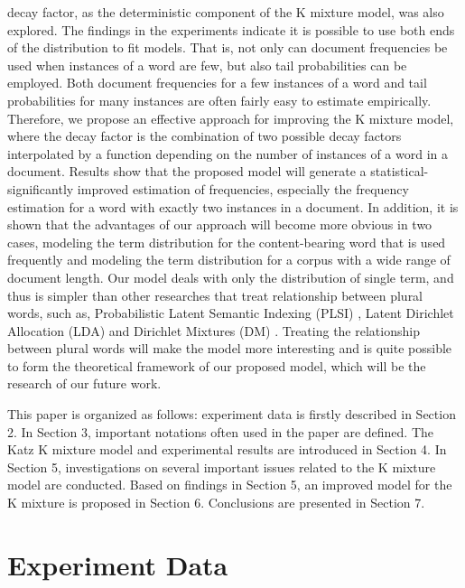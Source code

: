 \documentclass[english]{jnlp_1.4_rep}
\begin{document}
decay factor, as the deterministic component of the K mixture model, was also explored. The findings in the experiments indicate it is possible to
use both ends of the distribution to fit models. That is, not only can document frequencies be used when instances of a word are few, but also tail
probabilities can be employed. Both document frequencies for a few instances of a word and tail probabilities for many instances are often fairly
easy to estimate empirically. Therefore, we propose an effective approach for improving the K mixture model, where the decay factor is the
combination of two possible decay factors interpolated by a function depending on the number of instances of a word in a document. Results show that
the proposed model will generate a statistical-significantly improved estimation of frequencies, especially the frequency estimation for a word with
exactly two instances in a document. In addition, it is shown that the advantages of our approach will become more obvious in two cases, modeling
the term distribution for the content-bearing word that is used frequently and modeling the term distribution for a corpus with a wide range of
document length. Our model deals with only the distribution of single term, and thus is simpler than other researches that treat relationship
between plural words, such as, Probabilistic Latent Semantic Indexing (PLSI) \cite{Hoffman}, Latent Dirichlet Allocation (LDA) \cite{Daivd} and
Dirichlet Mixtures (DM) \cite{Mikio}. Treating the relationship between plural words will make the model more interesting and is quite possible to
form the theoretical framework of our proposed model, which will be the research of our future work.

This paper is organized as follows: experiment data is firstly described in Section 2. In Section 3, important notations often used in the paper are
defined. The Katz K mixture model and experimental results are introduced in Section 4. In Section 5, investigations on several important issues
related to the K mixture model are conducted. Based on findings in Section 5, an improved model for the K mixture is proposed in Section 6.
Conclusions are presented in Section 7.


\section{Experiment Data}
\end{document}
